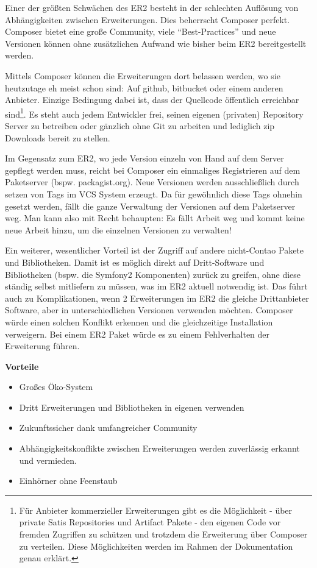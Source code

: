 \documentclass[
paper=a4,
draft=false,%
fontsize=10pt%
]{scrartcl}
\begin{document}
Einer der größten Schwächen des ER2 besteht in der schlechten Auflösung von Abhängigkeiten zwischen Erweiterungen. Dies beherrscht Composer perfekt. Composer bietet eine große Community, viele “Best-Practices” und neue Versionen können ohne zusätzlichen Aufwand wie bisher beim ER2 bereitgestellt werden.

Mittels Composer können die Erweiterungen dort belassen werden, wo sie heutzutage eh meist schon sind: Auf github, bitbucket oder einem anderen Anbieter. Einzige Bedingung dabei ist, dass der Quellcode öffentlich erreichbar sind\footnote{Für Anbieter kommerzieller Erweiterungen gibt es die Möglichkeit - über private Satis Repositories und Artifact Pakete - den eigenen Code vor fremden Zugriffen zu schützen und trotzdem die Erweiterung über Composer zu verteilen. Diese Möglichkeiten werden im Rahmen der Dokumentation genau erklärt.}.
Es steht auch jedem Entwickler frei, seinen eigenen (privaten) Repository Server zu betreiben oder gänzlich ohne Git zu arbeiten und lediglich zip Downloads bereit zu stellen.

Im Gegensatz zum ER2, wo jede Version einzeln von Hand auf dem Server gepflegt werden muss, reicht bei Composer ein einmaliges Registrieren auf dem Paketserver (bspw. packagist.org). Neue Versionen werden ausschließlich durch setzen von Tags im VCS System erzeugt. Da für gewöhnlich diese Tags ohnehin gesetzt werden, fällt die ganze Verwaltung der Versionen auf dem Paketserver weg. Man kann also mit Recht behaupten: Es fällt Arbeit weg und kommt keine neue Arbeit hinzu, um die einzelnen Versionen zu verwalten!

Ein weiterer, wesentlicher Vorteil ist der Zugriff auf andere nicht-Contao Pakete und Bibliotheken. Damit ist es möglich direkt auf Dritt-Software und Bibliotheken (bspw. die Symfony2 Komponenten) zurück zu greifen, ohne diese ständig selbst mitliefern zu müssen, was im ER2 aktuell notwendig ist. Das führt auch zu Komplikationen, wenn 2 Erweiterungen im ER2 die gleiche Drittanbieter Software, aber in unterschiedlichen Versionen verwenden möchten. Composer würde einen solchen Konflikt erkennen und die gleichzeitige Installation verweigern. Bei einem ER2 Paket würde es zu einem Fehlverhalten der Erweiterung führen.

\textbf{Vorteile}
\begin{itemize}
\item Großes Öko-System
\item Dritt Erweiterungen und Bibliotheken in eigenen verwenden
\item Zukunftssicher dank umfangreicher Community
\item Abhängigkeitskonflikte zwischen Erweiterungen werden zuverlässig erkannt und vermieden.
\item Einhörner ohne Feenstaub
\end{itemize}
\end{document}
